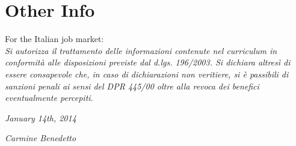 \documentclass[]{friggeri-cv}
\begin{document}
\section{Other Info}
For the Italian job market:\\
\emph{Si autorizza il trattamento delle informazioni contenute nel curriculum in conformità alle disposizioni previste dal d.lgs. 196/2003. Si dichiara altresì di essere consapevole che, in caso di dichiarazioni non veritiere, si è passibili di sanzioni penali ai sensi del DPR 445/00 oltre alla revoca dei benefici eventualmente percepiti.}
\\
\begin{flushleft}
\emph{January 14th, 2014}
\end{flushleft}
\begin{flushright}
\emph{Carmine Benedetto}
\end{flushright}

% 
\end{document}
